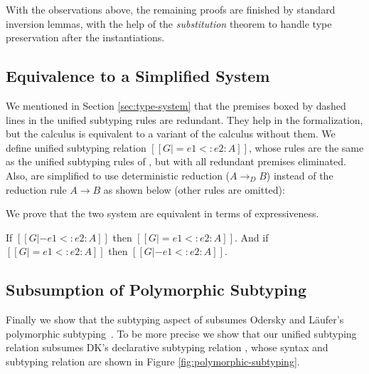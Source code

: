 With the observations above, the remaining proofs are finished by standard
inversion lemmas, with the help of the \emph{substitution} theorem to handle type
preservation after the instantiations.

\subsection{Equivalence to a Simplified System}
We mentioned in Section \ref{sec:type-system} that the premises boxed by dashed
lines in the unified subtyping rules are redundant.
They help in the formalization, but the calculus
is equivalent to a variant of the calculus without them.
We define unified subtyping relation
$[[G |= e1 <: e2 : A]]$, whose rules are the same as the unified subtyping rules of \name,
but with all redundant premises eliminated. Also, 
are simplified to use deterministic reduction ($A \longrightarrow_D B$)
instead of the reduction rule $A \longrightarrow B$ as shown below
(other rules are omitted):


We prove that the two system are equivalent in terms of expressiveness.

\begin{theorem}
  If $[[G |- e1 <: e2 : A]]$ then $[[G |= e1 <: e2 : A]]$.
  And if $[[G |= e1 <: e2 : A]]$ then $[[G |- e1 <: e2 : A]]$.
\end{theorem}

\subsection{Subsumption of Polymorphic Subtyping}

Finally we show that the subtyping aspect of \name subsumes
Odersky and L\"aufer's polymorphic
subtyping~\citep{odersky1996putting}. To be more precise
we show that our unified subtyping relation subsumes DK's declarative
subtyping relation \citep{dunfield2013complete}, whose syntax and subtyping relation
are shown in Figure \ref{fig:polymorphic-subtyping}.

